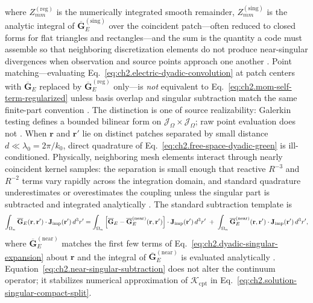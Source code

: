 where $Z_{mm}^{\mathrm{(reg)}}$ is the numerically integrated smooth remainder,
$Z_{mm}^{\mathrm{(sing)}}$ is the analytic integral of
\(\overline{\mathbf{G}}_{E}^{\mathrm{(sing)}}\) over the coincident patch---often
reduced to closed forms for flat triangles and rectangles---and the sum is the quantity a
code must assemble so that neighboring discretization elements do not produce near-singular divergences
when observation and source points approach one another \cite{stratton1941}. Point
matching---evaluating Eq.~\eqref{eq:ch2.electric-dyadic-convolution} at patch centers
with \(\overline{\mathbf{G}}_{E}\) replaced by
\(\overline{\mathbf{G}}_{E}^{\mathrm{(reg)}}\) only---is \emph{not} equivalent to
Eq.~\eqref{eq:ch2.mom-self-term-regularized} unless basis overlap and singular
subtraction match the same finite-part convention \cite{harrington2001}. The
distinction is one of source realizability: Galerkin testing defines a bounded bilinear form on
\(\mathcal{J}_\Omega\times\mathcal{J}_\Omega\); raw point evaluation does not
\cite{stratton1941}.
When \(\mathbf{r}\) and \(\mathbf{r}'\) lie on distinct patches separated by small
distance \(d\ll \lambda_0=2\pi/k_0\), direct quadrature of
Eq.~\eqref{eq:ch2.free-space-dyadic-green} is ill-conditioned. Physically, neighboring mesh
elements interact through nearly coincident kernel samples: the separation is small enough
that reactive $R^{-3}$ and $R^{-2}$ terms vary rapidly across the integration domain, and
standard quadrature underestimates or overestimates the coupling unless the singular part is
subtracted and integrated analytically \cite{harrington2001}. The standard
subtraction template is
\begin{equation}
\label{eq:ch2.near-singular-subtraction}
\int_{\Omega_n}
\overline{\mathbf{G}}_{E}(\mathbf{r},\mathbf{r}')\cdot\mathbf{J}_{\mathrm{imp}}(\mathbf{r}')\,d^{3}r'
=
\int_{\Omega_n}
\Big[\overline{\mathbf{G}}_{E}-\overline{\mathbf{G}}_{E}^{\mathrm{(near)}}(\mathbf{r},\mathbf{r}')\Big]
\cdot\mathbf{J}_{\mathrm{imp}}(\mathbf{r}')\,d^{3}r'
\;+\;
\int_{\Omega_n}
\overline{\mathbf{G}}_{E}^{\mathrm{(near)}}(\mathbf{r},\mathbf{r}')\cdot\mathbf{J}_{\mathrm{imp}}(\mathbf{r}')\,d^{3}r',
\end{equation}
where \(\overline{\mathbf{G}}_{E}^{\mathrm{(near)}}\) matches the first few terms of
Eq.~\eqref{eq:ch2.dyadic-singular-expansion} about \(\mathbf{r}\) and the integral of
\(\overline{\mathbf{G}}_{E}^{\mathrm{(near)}}\) is evaluated analytically
\cite{harrington2001}. Equation~\eqref{eq:ch2.near-singular-subtraction}
does not alter the continuum operator; it stabilizes numerical approximation of
\(\mathcal{K}_{\mathrm{cpt}}\) in Eq.~\eqref{eq:ch2.solution-singular-compact-split}.
